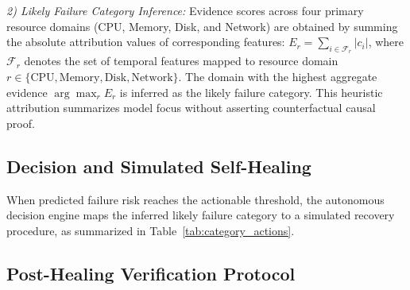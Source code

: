 \documentclass[conference]{IEEEtran}
\begin{document}
\textit{2) Likely Failure Category Inference:} Evidence scores across four primary resource domains (CPU, Memory, Disk, and Network) are obtained by summing the absolute attribution values of corresponding features: $E_r = \sum_{i \in \mathcal{F}_r} |c_i|$, where $\mathcal{F}_r$ denotes the set of temporal features mapped to resource domain $r \in \{\text{CPU}, \text{Memory}, \text{Disk}, \text{Network}\}$. The domain with the highest aggregate evidence $\arg\max_r E_r$ is inferred as the likely failure category. This heuristic attribution summarizes model focus without asserting counterfactual causal proof.

\subsection{Decision and Simulated Self-Healing}

When predicted failure risk reaches the actionable threshold, the autonomous decision engine maps the inferred likely failure category to a simulated recovery procedure, as summarized in Table~\ref{tab:category_actions}.

\begin{table}[htbp]
\centering
\caption{LIKELY FAILURE CATEGORY TO SIMULATED RECOVERY ACTION MAPPING}
\label{tab:category_actions}
\end{table}

\subsection{Post-Healing Verification Protocol}
\end{document}
